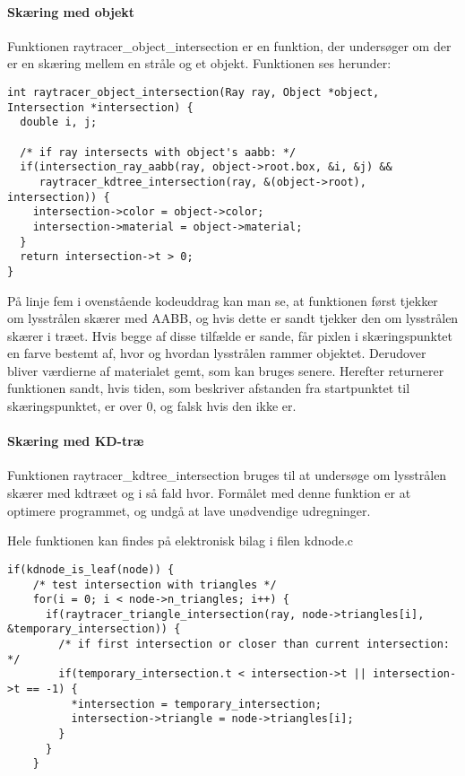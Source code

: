 \paragraph{Skæring med objekt}

Funktionen raytracer\_object\_intersection er en funktion, der undersøger om der er en skæring mellem en stråle og et objekt. Funktionen ses herunder:

\begin{lstlisting}[style=Cstyle, caption=raytracer\_object\_intersection]
int raytracer_object_intersection(Ray ray, Object *object, Intersection *intersection) {
  double i, j;
  
  /* if ray intersects with object's aabb: */
  if(intersection_ray_aabb(ray, object->root.box, &i, &j) && 
     raytracer_kdtree_intersection(ray, &(object->root), intersection)) {
    intersection->color = object->color;
    intersection->material = object->material;
  }
  return intersection->t > 0;
}
\end{lstlisting}

På linje fem i ovenstående kodeuddrag kan man se, at funktionen først tjekker om lysstrålen skærer med AABB, og hvis dette er sandt tjekker den om lysstrålen skærer i træet. Hvis begge af disse tilfælde er sande, får pixlen i skæringspunktet en farve bestemt af, hvor og hvordan lysstrålen rammer objektet. Derudover bliver værdierne af materialet gemt, som kan bruges senere. Herefter returnerer funktionen sandt, hvis tiden, som beskriver afstanden fra startpunktet til skæringspunktet, er over 0, og falsk hvis den ikke er.


\paragraph{Skæring med KD-træ}

Funktionen raytracer\_kdtree\_intersection bruges til at undersøge om lysstrålen skærer med kdtræet og i så fald hvor. Formålet med denne funktion er at optimere programmet, og undgå at lave unødvendige udregninger. 

Hele funktionen kan findes på elektronisk bilag i filen kdnode.c

\begin{lstlisting}[style=Cstyle, caption=if(leaf)]
  if(kdnode_is_leaf(node)) {
    /* test intersection with triangles */
    for(i = 0; i < node->n_triangles; i++) {
      if(raytracer_triangle_intersection(ray, node->triangles[i], &temporary_intersection)) {
        /* if first intersection or closer than current intersection: */
        if(temporary_intersection.t < intersection->t || intersection->t == -1) {
          *intersection = temporary_intersection;
          intersection->triangle = node->triangles[i];
        }
      }
    }
\end{lstlisting}

